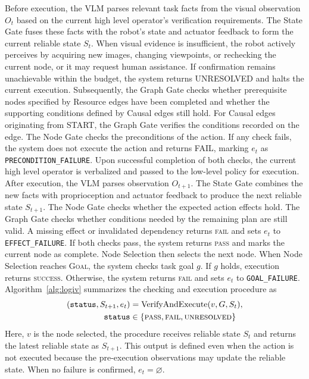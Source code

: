\documentclass[letterpaper,10pt,conference]{ieeeconf}
\begin{document}
Before execution, the VLM parses relevant task facts from the visual observation $O_t$ based on the current high level operator's verification requirements. The State Gate fuses these facts with the robot's state and actuator feedback to form the current reliable state $S_t$. When visual evidence is insufficient, the robot actively perceives by acquiring new images, changing viewpoints, or rechecking the current node, or it may request human assistance. If confirmation remains unachievable within the budget, the system returns \textsc{UNRESOLVED} and halts the current execution. Subsequently, the Graph Gate checks whether prerequisite nodes specified by Resource edges have been completed and whether the supporting conditions defined by Causal edges still hold. For Causal edges originating from \textsc{START}, the Graph Gate verifies the conditions recorded on the edge. The Node Gate checks the preconditions of the action. If any check fails, the system does not execute the action and returns \textsc{FAIL}, marking $e_t$ as \texttt{PRECONDITION\_FAILURE}. Upon successful completion of both checks, the current high level operator is verbalized and passed to the low-level policy for execution.
After execution, the VLM parses observation $O_{t+1}$. The State Gate combines the new facts with proprioception and actuator feedback to produce the next reliable state $S_{t+1}$. The Node Gate checks whether the expected action effects hold. The Graph Gate checks whether conditions needed by the remaining plan are still valid. A missing effect or invalidated dependency returns \textsc{fail} and sets $e_t$ to \texttt{EFFECT\_FAILURE}. If both checks pass, the system returns \textsc{pass} and marks the current node as complete. Node Selection then selects the next node. When Node Selection reaches \textsc{Goal}, the system checks task goal $g$. If $g$ holds, execution returns \textsc{success}. Otherwise, the system returns \textsc{fail} and sets $e_t$ to \texttt{GOAL\_FAILURE}. Algorithm~\ref{alg:logiv} summarizes the checking and execution procedure as
\begin{equation}
\begin{aligned}
(\texttt{status},S_{t+1},e_t)
&=\operatorname{VerifyAndExecute}(v,G,S_t),\\
\texttt{status}
&\in\{\textsc{pass},\textsc{fail},\textsc{unresolved}\}
\end{aligned}
\label{eq:verify_execute}
\end{equation}
Here, $v$ is the node selected, the procedure receives reliable state $S_t$ and returns the latest reliable state as $S_{t+1}$. This output is defined even when the action is not executed because the pre-execution observations may update the reliable state. When no failure is confirmed, $e_t=\varnothing$.
\end{document}
